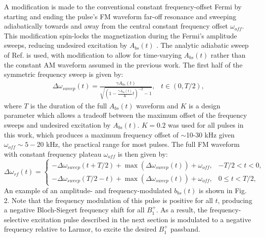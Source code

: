 \documentclass{article}
\newcommand{\bbst}{b_{bs}(t)}
\begin{document}
\par A modification is made 
to the conventional constant frequency-offset Fermi by starting and ending the pulse's FM waveform
far-off resonance and sweeping adiabatically towards and away from the central constant frequency offset $\omega_{off}$. 
This modification spin-locks the magnetization during the Fermi's amplitude sweeps, reducing undesired excitation by $A_{bs}(t)$ \cite{Garwood2001TheNMR, Khalighi2012RFMapping}.
The analytic adiabatic sweep of Ref. \cite{KhalighiAdiabaticMapping} is used, 
with modification to allow for time-varying $A_{bs}(t)$ rather than the constant AM waveform assumed in the previous work. The first half of the symmetric frequency sweep is given by:
\begin{equation}
    \begin{array}{ll}
    \Delta\omega_{sweep}(t) = \frac{\gamma A_{bs}(t)}{\sqrt{\left(1-\frac{\gamma A_{bs}(t)}{K}t\right)^{-2}-1}}, & t \in \left(0, T/2\right), \end{array}
\end{equation}
where $T$ is the duration of the full $A_{bs}(t)$ waveform and $K$ is a design parameter which allows a tradeoff between the maximum offset of the frequency sweeps and undesired excitation by $A_{bs}(t)$.
$K = 0.2$ was used for all pulses in this work, 
which produces a maximum frequency offset of $\sim$10-30 kHz given $\omega_{off}\sim5-20$ kHz, the practical range for most pulses. 
The full FM waveform with constant frequency plateau $\omega_{off}$ is then given by:
\begin{equation}
	\Delta\omega_{rf}(t) = \left\{ \begin{array}{rl} 	-\Delta\omega_{sweep}(t+T/2)+\max(\Delta\omega_{sweep}(t))+\omega_{off}, & -T/2<t<0, \\ 
	-\Delta\omega_{sweep}(T/2 - t)+\max(\Delta\omega_{sweep}(t))+\omega_{off}, & 0 \leq t<T/2, \end{array} \right.
\end{equation}
An example of an amplitude- and frequency-modulated $\bbst$ is shown in Fig. 2.
Note that the frequency modulation of this pulse is positive for all $t$, 
producing a negative Bloch-Siegert frequency shift for all $B_1^+$. 
As a result, the frequency-selective excitation pulse described in the next section is 
modulated to a negative frequency relative to Larmor, 
to excite the desired $B_1^+$ passband.
\end{document}
